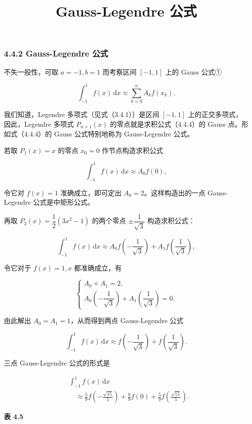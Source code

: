 \documentclass[
  10pt,
  fontset=fandol]{ctexart}
\title{Gauss-Legendre 公式}
\author{}
\date{}
\begin{document}
\maketitle

\subsubsection{4.4.2 Gauss-Legendre 公式}\label{gauss-legendre-ux516cux5f0f}

不失一般性，可取 \(a=-1,b=1\) 而考察区间 \([-1,1]\) 上的 Gauss 公式①

\[
\int_{-1}^{1}f(x)\,\mathrm{d}x\approx\sum_{k=0}^{n}A_kf(x_k).
\tag{4.4.4}
\]

我们知道，Legendre 多项式（见式（3.4.1））是区间 \([-1,1]\) 上的正交多项式，因此，Legendre 多项式 \(P_{n+1}(x)\) 的零点就是求积公式（4.4.4）的 Gauss 点。形如式（4.4.4）的 Gauss 公式特别地称为 Gauss-Legendre 公式。

若取 \(P_1(x)=x\) 的零点 \(x_0=0\) 作节点构造求积公式

\[
\int_{-1}^{1}f(x)\,\mathrm{d}x\approx A_0f(0),
\]

令它对 \(f(x)=1\) 准确成立，即可定出 \(A_0=2\)。这样构造出的一点 Gauss-Legendre 公式是中矩形公式。

再取 \(P_2(x)=\dfrac12(3x^2-1)\) 的两个零点 \(\pm\dfrac1{\sqrt3}\) 构造求积公式：

\[
\int_{-1}^{1}f(x)\,\mathrm{d}x\approx
A_0f\left(-\frac1{\sqrt3}\right)+A_1f\left(\frac1{\sqrt3}\right),
\]

令它对于 \(f(x)=1,x\) 都准确成立，有

\[
\begin{cases}
A_0+A_1=2,\\[3pt]
A_0\left(-\dfrac1{\sqrt3}\right)+A_1\left(\dfrac1{\sqrt3}\right)=0.
\end{cases}
\]

由此解出 \(A_0=A_1=1\)，从而得到两点 Gauss-Legendre 公式

\[
\int_{-1}^{1}f(x)\,\mathrm{d}x\approx
f\left(-\frac1{\sqrt3}\right)+f\left(\frac1{\sqrt3}\right).
\]

三点 Gauss-Legendre 公式的形式是

\[
\begin{aligned}
&\int_{-1}^{1}f(x)\,\mathrm{d}x\\
&\quad\approx\frac59f\left(-\frac{\sqrt{15}}5\right)
+\frac89f(0)+\frac59f\left(\frac{\sqrt{15}}5\right).
\end{aligned}
\]

\textbf{表 4.5}
\end{document}
